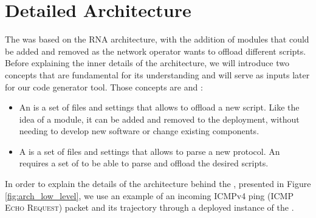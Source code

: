 \section{Detailed Architecture}

The \TheSolutionName{} was based on the RNA architecture, with the addition of modules that could be added and removed as the network operator wants to offload different scripts. Before explaining the inner details of the architecture, we will introduce two concepts that are fundamental for its understanding and will serve as inputs later for our code generator tool. Those concepts are \ProtocolTemplate{} and \Offloader{}:

\begin{itemize}
    \item An \textbf{\Offloader{}} is a set of files and settings that allows \TheSolutionName{} to offload a new script. Like the idea of a module, it can be added and removed to the deployment, without needing to develop new software or change existing components.

    \item A \textbf{\ProtocolTemplate{}} is a set of files and settings that allows \TheSolutionName{} to parse a new protocol. An \Offloader{} requires a set of \ProtocolTemplates{} to be able to parse and offload the desired scripts.
\end{itemize}

In order to explain the details of the architecture behind the \TheSolutionName{}, presented in Figure \ref{fig:arch_low_level}, we use an example of an incoming ICMPv4 ping (\textsc{ICMP Echo Request}) packet and its trajectory through a deployed instance of the \TheSolutionName{}.

